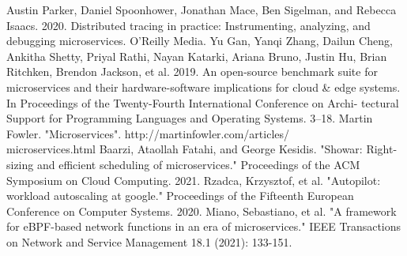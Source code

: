 \documentclass[conference]{IEEEtran}
\begin{document}
\begin{thebibliography}{00}
     Austin Parker, Daniel Spoonhower, Jonathan Mace, Ben Sigelman, and Rebecca Isaacs. 2020. Distributed tracing in practice: Instrumenting, analyzing, and debugging microservices. O’Reilly Media.
     Yu Gan, Yanqi Zhang, Dailun Cheng, Ankitha Shetty, Priyal Rathi, Nayan Katarki, Ariana Bruno, Justin Hu, Brian Ritchken, Brendon Jackson, et al. 2019. An open-source benchmark suite for microservices and their hardware-software implications for cloud \& edge systems. In Proceedings of the Twenty-Fourth International Conference on Archi- tectural Support for Programming Languages and Operating Systems. 3–18.
     \sloppy Martin Fowler. "Microservices". http://martinfowler.com/articles/\\microservices.html
     Baarzi, Ataollah Fatahi, and George Kesidis. "Showar: Right-sizing and efficient scheduling of microservices." Proceedings of the ACM Symposium on Cloud Computing. 2021.
     Rzadca, Krzysztof, et al. "Autopilot: workload autoscaling at google." Proceedings of the Fifteenth European Conference on Computer Systems. 2020.
     Miano, Sebastiano, et al. "A framework for eBPF-based network functions in an era of microservices." IEEE Transactions on Network and Service Management 18.1 (2021): 133-151.
\end{thebibliography}
\end{document}
